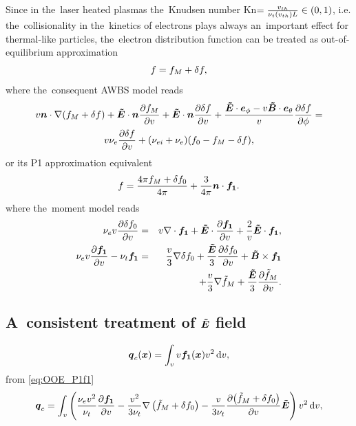 \documentclass[preprint,12pt]{elsarticle}
\newcounter{bla}
\begin{document}
Since in the~laser heated plasmas the~Knudsen number 
Kn$ = \frac{v_{th}}{\nu_t(v_{th}) L} \in (0, 1)$, i.e. the~collisionality in 
the~kinetics of electrons plays always an~important effect for thermal-like 
particles, the~electron distribution 
function can be treated as out-of-equilibrium approximation 
\begin{equation}
  f = f_M + \delta f ,
  \label{eq:OOE_outofeq}
\end{equation}  
where the~consequent AWBS model reads
\begin{multline}
  v\boldsymbol{n}\cdot\nabla (f_M + \delta f) + \boldsymbol{\tilde{E}}\cdot\boldsymbol{n} \frac{\partial{f_M}}{\partial{v}} 
  + \boldsymbol{\tilde{E}}\cdot\boldsymbol{n} \frac{\partial{\delta f}}{\partial{v}} 
  + \frac{\boldsymbol{\tilde{E}}\cdot\boldsymbol{e}_\phi 
  - v\boldsymbol{\tilde{B}}\cdot\boldsymbol{e}_\theta}{v}\frac{\partial{\delta f}}{\partial{\phi}}
  = \\
  v \nu_{e} \frac{\partial{\delta f}}{\partial{v}} 
  + (\nu_{ei} + \nu_{e}) (f_0 - f_M - \delta f) ,
  \label{eq:OOE_AWBS_model}
\end{multline}
or its P1 approximation equivalent
\begin{equation}
  f = \frac{4\pi f_M + \delta f_0}{4\pi} + \frac{3}{4\pi}\boldsymbol{n}\cdot\boldsymbol{f_1} .
  \label{eq:OOE_P1outofeq}
\end{equation}
where the~moment model reads
\begin{eqnarray}
  \nu_{e}v\frac{\partial{\delta f_0}}{\partial{v}} &=&
  v\nabla\cdot\boldsymbol{f_1} + \boldsymbol{\tilde{E}}\cdot
  \frac{\partial{\boldsymbol{f_1}}}{\partial{v}} + \frac{2}{v}\boldsymbol{\tilde{E}}\cdot\boldsymbol{f_1} , 
  \label{eq:OOE_P1f0}\\
  \nu_{e}v\frac{\partial{\boldsymbol{f_1}}}{\partial{v}} - \nu_{t}\boldsymbol{f_1} &=& 
  \frac{v}{3}\nabla\delta f_0 + 
  \frac{\boldsymbol{\tilde{E}}}{3}\frac{\partial{\delta f_0}}{\partial{v}} + \boldsymbol{\tilde{B}}\times\boldsymbol{f_1} 
  \nonumber \\
  & & + \frac{v}{3}\nabla\tilde{f}_M + \frac{\boldsymbol{\tilde{E}}}{3}\frac{\partial{\tilde{f}_M}}{\partial{v}} .
  \label{eq:OOE_P1f1}
\end{eqnarray}

\subsection{A~consistent treatment of $\boldsymbol{\tilde{E}}$ field}
\label{sec:OOE_E_treatment}
\begin{equation}
  \boldsymbol{q}_c(\boldsymbol{x}) = \int_{v}
  v\boldsymbol{f_1}(\boldsymbol{x}) v^2\, \text{d}v , \nonumber 
\end{equation}
from \eqref{eq:OOE_P1f1}
\begin{equation}
  \boldsymbol{q}_c =
  \int_{v} \left(\frac{\nu_{e}v^2}{\nu_{t}}\frac{\partial{\boldsymbol{f_1}}}{\partial{v}}
  - \frac{v^2}{3\nu_{t}}\nabla\left(\tilde{f}_M + \delta f_0\right) - 
  \frac{v}{3\nu_{t}}\frac{\partial{\left(\tilde{f}_M+ \delta f_0\right)}}{\partial{v}}\boldsymbol{\tilde{E}}
  \right) v^2\, \text{d}v ,
  \label{eq:OOE_P1current}
\end{equation}
\end{document}

